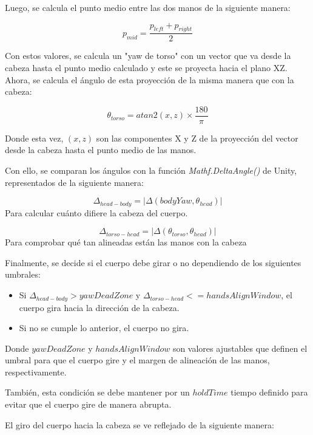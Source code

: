 Luego, se calcula el punto medio entre las dos manos de la siguiente manera:

\begin{equation}
    p_{mid} = \frac{p_{left} + p_{right}}{2}
\end{equation}

Con estos valores, se calcula un "yaw de torso" con un vector que va desde la cabeza hasta el punto medio calculado y este se proyecta hacia el plano XZ.
Ahora, se calcula el ángulo de esta proyección de la misma manera que con la cabeza:

\begin{equation}
    \theta_{torso} = atan2(x, z) \times \frac{180}{\pi}
\end{equation}

Donde esta vez, $(x, z)$ son las componentes X y Z de la proyección del vector desde la cabeza hasta el punto medio de las manos.

Con ello, se comparan los ángulos con la función \textit{Mathf.DeltaAngle()} de Unity, representados de la siguiente manera:

\begin{equation}
    \Delta_{head-body} = |\Delta(bodyYaw, \theta_{head})|
\end{equation}
Para calcular cuánto difiere la cabeza del cuerpo.

\begin{equation}
    \Delta_{torso-head} = |\Delta(\theta_{torso}, \theta_{head})|
\end{equation}
Para comprobar qué tan alineadas están las manos con la cabeza

Finalmente, se decide si el cuerpo debe girar o no dependiendo de los siguientes umbrales:
\begin{itemize}
    \item Si $\Delta_{head-body} >  yawDeadZone$ y $\Delta_{torso-head} <= handsAlignWindow$, el cuerpo gira hacia la dirección de la cabeza.
    \item Si no se cumple lo anterior, el cuerpo no gira.
\end{itemize}

Donde $yawDeadZone$ y $handsAlignWindow$ son valores ajustables que definen el umbral para que el cuerpo gire y el margen de alineación de las manos, respectivamente.

También, esta condición se debe mantener por un $holdTime$ tiempo definido para evitar que el cuerpo gire de manera abrupta.

El giro del cuerpo hacia la cabeza se ve reflejado de la siguiente manera:


